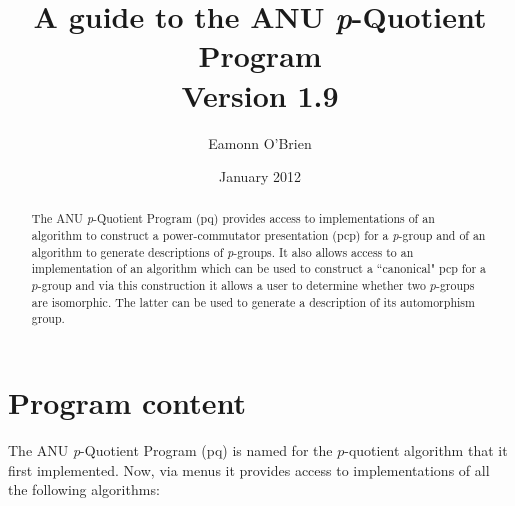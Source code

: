 \documentclass[12pt]{article}
\begin{document}
\title{A guide to the ANU {\it p}-Quotient Program\\Version 1.9}
\author{Eamonn O'Brien}
\date{January 2012}
\maketitle
\tableofcontents
\pagebreak

\begin{abstract}
The ANU {\it p}-Quotient Program (pq) provides access to implementations
of an algorithm to construct a power-commutator presentation (pcp) for 
a {\it p}-group and of an algorithm to generate descriptions of 
{\it p}-groups.  It also allows access to an implementation
of an algorithm which can be used to construct a ``canonical" 
pcp for a $p$-group and via this construction it allows a user 
to determine whether two $p$-groups are isomorphic. The latter
can be used to generate a description of its automorphism group.
\end{abstract}

\section{Program content}\label{sec:prog-content}
The ANU {\it p}-Quotient Program (pq) is named for the $p$-quotient algorithm
that it first implemented. Now, via menus it provides access to implementations
of all the following algorithms:
\end{document}
